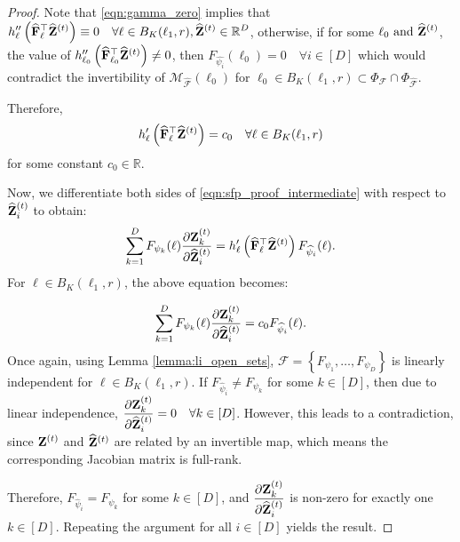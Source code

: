 \begin{proof}
  Note that \eqref{eqn:gamma_zero} implies that $\displaystyle h''_{\ell}\left(\widehat{\mathbf{F}}_{\ell}^\top \widehat{\mathbf{Z}}^{(t)} \right) \equiv 0 \quad  \forall \ell \in B_K(\ell_1, r), \widehat{\mathbf{Z}}^{(t)} \in \mathbb{R}^{D}$, otherwise, if for some $\displaystyle {\ell}_0 \text{ and } \widehat{\mathbf{Z}}^{(t)}$,  the value of $h''_{{\ell}_0}\left(\widehat{\mathbf{F}}_{{\ell}_0}^\top \widehat{\mathbf{Z}}^{(t)} \right) \neq 0$, then $F_{\widehat{\psi_i}}({\ell}_0)=0 \quad \forall i \in [D]$ which would contradict the invertibility of $\mathcal{M}_{\widehat{\mathcal{F}}}(\ell_0)$ for ${\ell}_0 \in B_K(\ell_1, r) \subset \Phi_\mathcal{F} \cap \Phi_{\widehat{\mathcal{F}}}$.

  Therefore,
  \begin{equation}
      h'_{\ell}\left(\widehat{\mathbf{F}}_{\ell}^\top \widehat{\mathbf{Z}}^{(t)} \right) = c_0 \quad \forall \ell \in B_K(\ell_1, r) \label{eqn:constancy}
  \end{equation}
  for some constant $c_0 \in \mathbb{R}$.

  Now, we differentiate both sides of \eqref{eqn:sfp_proof_intermediate} with respect to $\widehat{\mathbf{Z}}^{(t)}_i$ to obtain:
  \begin{equation}
      \sum_{k=1}^D F_{\psi_k}(\ell) \frac{\partial \mathbf{Z}^{(t)}_k}{\partial \widehat{\mathbf{Z}}^{(t)}_i} = h'_{\ell}\left(\widehat{\mathbf{F}}_{\ell}^\top \widehat{\mathbf{Z}}^{(t)} \right) F_{\widehat{\psi}_i}(\ell).
  \end{equation}
  For $\ell \in B_K(\ell_1, r)$, the above equation becomes:
  
  \begin{equation}
      \sum_{k=1}^D F_{\psi_k}(\ell) \frac{\partial \mathbf{Z}^{(t)}_k}{\partial \widehat{\mathbf{Z}}^{(t)}_i} = c_0 F_{\widehat{\psi}_i}(\ell).
  \end{equation}
  Once again, using Lemma \ref{lemma:li_open_sets},  $\mathcal{F} = \left\{ F_{\psi_1}, \ldots, F_{\psi_D}\right\}$ is linearly independent for $\ell \in B_K(\ell_1, r)$. If $F_{\widehat{\psi}_i} \neq F_{{\psi}_k}$ for some $k \in [D]$, then due to linear independence, $\displaystyle \frac{\partial \mathbf{Z}^{(t)}_k}{\partial \widehat{\mathbf{Z}}^{(t)}_i} = 0 \quad \forall k \in [D]$. However, this leads to a contradiction, since $\mathbf{Z}^{(t)}$ and $\widehat{\mathbf{Z}}^{(t)}$ are related by an invertible map, which means the corresponding Jacobian matrix is full-rank. 

  Therefore, $F_{\widehat{\psi}_i} = F_{{\psi}_k}$ for some $k \in [D]$, and $\displaystyle \frac{\partial \mathbf{Z}^{(t)}_k}{\partial \widehat{\mathbf{Z}}^{(t)}_i}$ is non-zero for exactly one $k \in [D]$. Repeating the argument for all $i \in [D]$ yields the result.
\end{proof}



